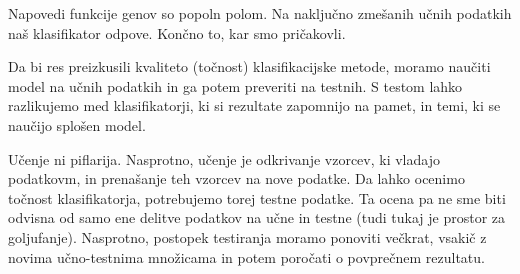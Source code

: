 Napovedi funkcije genov so popoln polom. Na naključno zmešanih učnih podatkih naš klasifikator odpove. Končno to, kar smo pričakovli.

Da bi res preizkusili kvaliteto (točnost) klasifikacijske metode, moramo naučiti model na učnih podatkih in ga potem preveriti na testnih. S testom lahko razlikujemo med klasifikatorji, ki si rezultate zapomnijo na pamet, in temi, ki se naučijo splošen model. 

Učenje ni piflarija. Nasprotno, učenje je odkrivanje vzorcev, ki vladajo podatkovm, in prenašanje teh vzorcev na nove podatke. Da lahko ocenimo točnost klasifikatorja, potrebujemo torej testne podatke. Ta ocena pa ne sme biti odvisna od samo ene delitve podatkov na učne in testne (tudi tukaj je prostor za goljufanje). Nasprotno, postopek testiranja moramo ponoviti večkrat, vsakič z novima učno-testnima množicama in potem poročati o povprečnem rezultatu.